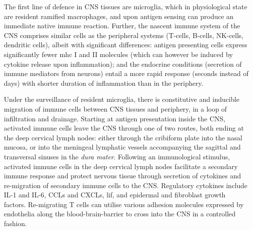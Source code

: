 The first line of defence in CNS tissues are microglia, which in physiological state are resident ramified macrophages, and upon antigen sensing can produce an immediate native immune reaction. Further, the nascent immune system of the CNS comprises similar cells as the peripheral systems (T-cells, B-cells, NK-cells, dendritic cells), albeit with significant differences: antigen presenting cells express significantly fewer \ac{mhc} I and II molecules (which can however be induced by cytokine release upon inflammation); and the endocrine conditions (secretion of immune mediators from neurons) entail a more rapid response (seconds instead of days) with shorter duration of inflammation than in the periphery.\cite{Negi2018}

Under the surveillance of resident microglia, there is constitutive and inducible migration of immune cells between CNS tissues and periphery, in a loop of infiltration and drainage. Starting at antigen presentation inside the CNS, activated immune cells leave the CNS through one of two routes, both ending at the deep cervical lymph nodes: either through the cribiform plate into the nasal mucosa, or into the meningeal lymphatic vessels accompanying the sagittal and transversal sinuses in the \emph{dura mater}. Following an immunological stimulus, activated immune cells in the deep cervical lymph nodes facilitate a secondary immune response and protect nervous tissue through secretion of cytokines\cite{Walsh2015} and re-migration of secondary immune cells to the CNS. Regulatory cytokines include IL-1 and IL-6, CCLs and CXCLs, \ac{lif}, and epidermal and fibroblast growth factors. Re-migrating T cells can utilise various adhesion molecules expressed by endothelia along the blood-brain-barrier to cross into the CNS in a controlled fashion.\cite{Negi2018}




